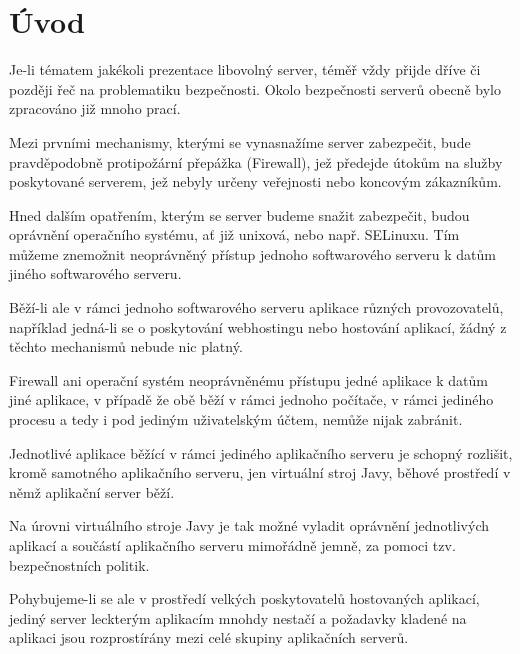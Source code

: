 
\chapter{Úvod} \label{uplnyUvod}

Je-li tématem jakékoli prezentace libovolný server, téměř vždy přijde dříve či později řeč na problematiku bezpečnosti.
Okolo bezpečnosti serverů obecně bylo zpracováno již mnoho prací.

Mezi prvními mechanismy, kterými se vynasnažíme server zabezpečit, bude pravděpodobně protipožární přepážka (Firewall), jež předejde útokům na služby poskytované serverem, jež nebyly určeny veřejnosti nebo koncovým zákazníkům.

Hned dalším opatřením, kterým se server budeme snažit zabezpečit, budou oprávnění operačního systému, ať již unixová, nebo např. SELinuxu. Tím můžeme znemožnit neoprávněný přístup jednoho softwarového serveru k datům jiného softwarového serveru.

Běží-li ale v rámci jednoho softwarového serveru aplikace různých provozovatelů, například jedná-li
se o poskytování webhostingu nebo hostování aplikací, žádný z těchto mechanismů nebude nic platný.

Firewall ani operační systém neoprávněnému přístupu jedné aplikace k datům jiné aplikace, v případě že obě běží v rámci jednoho počítače, v rámci jediného procesu a tedy i pod jediným uživatelským účtem, nemůže nijak zabránit.

Jednotlivé aplikace běžící v rámci jediného aplikačního serveru je schopný rozlišit, kromě samotného aplikačního serveru, jen virtuální stroj Javy, běhové prostředí v němž aplikační server běží.

Na úrovni virtuálního stroje Javy je tak možné vyladit oprávnění jednotlivých aplikací a součástí aplikačního serveru mimořádně jemně, za pomoci tzv. bezpečnostních politik.

Pohybujeme-li se ale v prostředí velkých poskytovatelů hostovaných aplikací, jediný server leckterým aplikacím
mnohdy nestačí a požadavky kladené na aplikaci jsou rozprostírány mezi celé skupiny aplikačních serverů.

